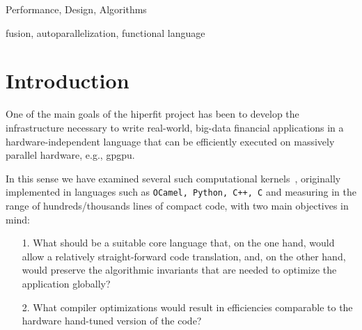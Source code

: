 \documentclass{sigplanconf}  %
\begin{document}


\terms
Performance, Design, Algorithms

\keywords
fusion, autoparallelization, functional language

\section{Introduction}
\label{sec:Introduction}



One of the main goals of the {\sc hiperfit} project has been to
develop the infrastructure necessary to write real-world, big-data 
financial applications in a hardware-independent language that can 
be efficiently executed on massively parallel hardware, e.g., {\sc gpgpu}.  %

In this sense we have examined several such computational kernels~\cite{PricingFHPC}, 
originally implemented in languages such as {\tt OCamel, Python, C++, C}  
and measuring in the range of hundreds/thousands lines of compact code, 
with two main objectives in mind: 
\begin{itemize}
    \item[1.] What should be a suitable core language that, on the
                one hand, would allow a relatively straight-forward 
                code translation, and, on the other hand, would
                preserve the algorithmic invariants that are needed
                to optimize the application globally?
    \item[2.] What compiler optimizations would result in efficiencies
                comparable to the hardware hand-tuned version 
                of the code?
\end{itemize}
\end{document}
